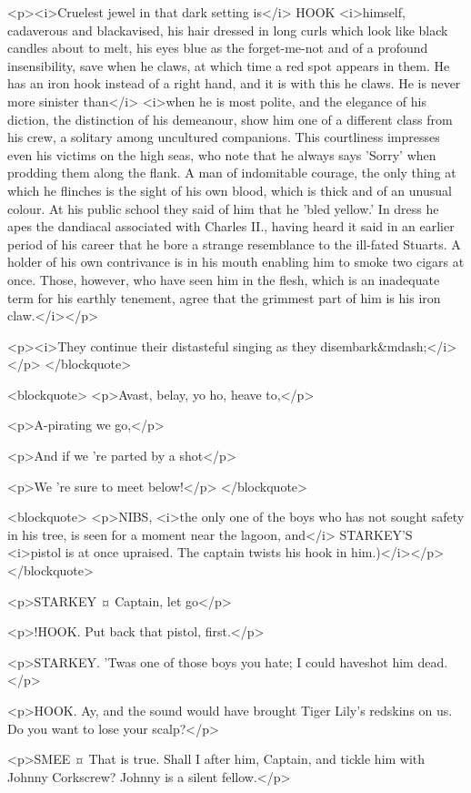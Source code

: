 <p><i>Cruelest jewel in that dark setting is</i> HOOK <i>himself, cadaverous and blackavised, his hair dressed in long curls which look like black candles about to melt, his eyes blue as the forget-me-not and of a profound insensibility, save when he claws, at which time a red spot appears in them. He has an iron hook instead of a right hand, and it is with this he claws. He is never more sinister than</i> <i>when he is most polite, and the elegance of his diction, the distinction of his demeanour, show him one of a different class from his crew, a solitary among uncultured companions. This courtliness impresses even his victims on the high seas, who note that he always says 'Sorry' when prodding them along the flank. A man of indomitable courage, the only thing at which he flinches is the sight of his own blood, which is thick and of an unusual colour. At his public school they said of him that he 'bled yellow.' In dress he apes the dandiacal associated with Charles II., having heard it said in an earlier period of his career that he bore a strange resemblance to the ill-fated Stuarts. A holder of his own contrivance is in his mouth enabling him to smoke two cigars at once. Those, however, who have seen him in the flesh, which is an inadequate term for his earthly tenement, agree that the grimmest part of him is his iron claw.</i></p>

<p><i>They continue their distasteful singing as they disembark&mdash;</i></p> </blockquote>

<blockquote> <p>Avast, belay, yo ho, heave to,</p>

<p>A-pirating we go,</p>

<p>And if we 're parted by a shot</p>

<p>We 're sure to meet below!</p> </blockquote>

<blockquote> <p>NIBS, <i>the only one of the boys who has not sought safety in his tree, is seen for a moment near the lagoon, and</i> STARKEY'S <i>pistol is at once upraised. The captain twists his hook in him.)</i></p> </blockquote>

<p>STARKEY ¤
Captain, let go</p>

<p>!HOOK. Put back that pistol, first.</p>

<p>STARKEY. 'Twas one of those boys you hate; I could haveshot him dead.</p>

<p>HOOK. Ay, and the sound would have brought Tiger Lily's redskins on us. Do you want to lose your scalp?</p>

<p>SMEE ¤
That is true. Shall I after him, Captain, and tickle him with Johnny Corkscrew? Johnny is a silent fellow.</p>


